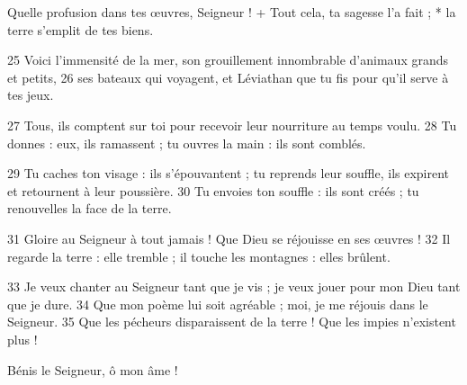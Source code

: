 Quelle profusion dans tes œuvres, Seigneur ! +
Tout cela, ta sagesse l'a fait ; *
la terre s'emplit de tes biens.

25 Voici l'immensité de la mer,
son grouillement innombrable d'animaux grands et petits,
26 ses bateaux qui voyagent,
et Léviathan que tu fis pour qu'il serve à tes jeux.

27 Tous, ils comptent sur toi
pour recevoir leur nourriture au temps voulu.
28 Tu donnes : eux, ils ramassent ;
tu ouvres la main : ils sont comblés.

29 Tu caches ton visage : ils s'épouvantent ;
tu reprends leur souffle, ils expirent
   et retournent à leur poussière.
30 Tu envoies ton souffle : ils sont créés ;
tu renouvelles la face de la terre.

31 Gloire au Seigneur à tout jamais !
Que Dieu se réjouisse en ses œuvres !
32 Il regarde la terre : elle tremble ;
il touche les montagnes : elles brûlent.

33 Je veux chanter au Seigneur tant que je vis ;
je veux jouer pour mon Dieu tant que je dure.
34 Que mon poème lui soit agréable ;
moi, je me réjouis dans le Seigneur.
35 Que les pécheurs disparaissent de la terre !
Que les impies n'existent plus !

Bénis le Seigneur, ô mon âme !